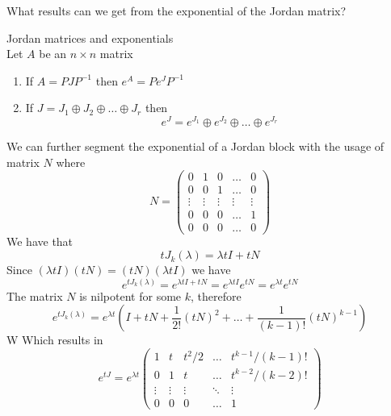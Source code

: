 \documentclass[journal, letterpaper]{IEEEtran}
\begin{document}
    What results can we get from the exponential of the Jordan matrix?
    \begin{myboxr}{Jordan matrices and exponentials} \\ 
        Let $A$ be an $n \times n$ matrix
        \begin{enumerate}
            \item If $A = PJP^{-1}$ then $e^A = Pe^JP^{-1}$
            \item If $J = J_1 \oplus J_2 \oplus \dots \oplus J_r$ then
            $$ e^J = e^{J_1} \oplus e^{J_2} \oplus \dots \oplus e^{J_r}$$
        \end{enumerate}
    \end{myboxr}
    We can further segment the exponential of a Jordan block with the usage of matrix $N$ where
    $$ N = \begin{pmatrix}
        0 & 1 & 0 &\dots & 0 \\
        0 & 0 & 1 &\dots &  0 \\
        \vdots & \vdots & \vdots & \vdots & \vdots \\ 
        0 & 0 & 0 &\dots & 1 \\
        0 & 0 & 0 & \dots & 0
    \end{pmatrix}$$
    We have that
    $$ tJ_k(\lambda) = \lambda tI + tN$$
    Since $(\lambda tI)(tN) = (tN)(\lambda tI)$ we have
    $$ e^{tJ_k(\lambda)} = e^{\lambda tI + tN} = e^{\lambda tI}e^{tN} = e^{\lambda t}e^{tN}$$
    The matrix $N$ is nilpotent for some $k$, therefore
    $$ e^{tJ_k(\lambda)} = e^{\lambda t}(I + tN + \frac{1}{2!}(tN)^2 + \dots + \frac{1}{(k-1)!}(tN)^{k-1})$$W
    Which results in
    $$ e^{tJ} = e^{\lambda t} \begin{pmatrix}
        1 & t & t^2/2 & \dots & t^{k-1}/(k-1)! \\
        0 & 1 & t & \dots & t^{k-2}/(k-2)! \\ 
        \vdots & \vdots & \vdots & \ddots & \vdots \\
        0 & 0 & 0 & \dots & 1
    \end{pmatrix}$$
\end{document}
